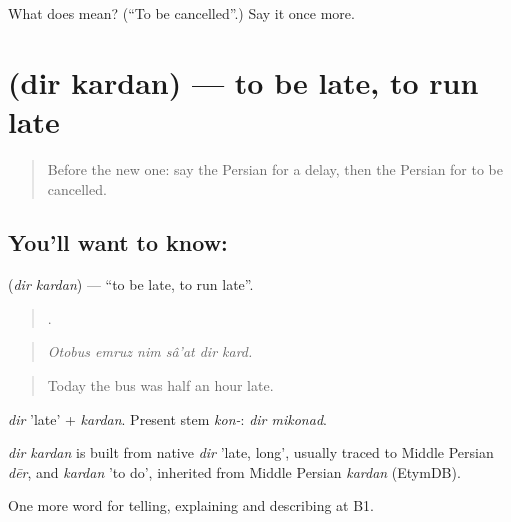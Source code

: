 \begin{tcolorbox}[breakable,colback=teal!4,colframe=teal!35!black,title={Before you move on}]
What does   mean? (\textquotedblleft{}To be cancelled\textquotedblright{}.) Say it once more.
\end{tcolorbox}
\section[\texorpdfstring{\fa{دیر} \fa{کردن} (dir kardan)}{دیر کردن (dir kardan)}]{  (dir kardan) — to be late, to run late}

\label{lesson:FA-C430-dir-kardan}



\begin{quote}
Before the new one: say the Persian for a delay, then the Persian for to be cancelled.
\end{quote}

\subsection*{You'll want to know:  }
\textbf{ } (\emph{dir kardan}) — \textquotedblleft{}to be late, to run late\textquotedblright{}.

\begin{quote}
     .
\end{quote}

\begin{quote}
\emph{Otobus emruz nim sâ'at dir kard.}
\end{quote}

\begin{quote}
Today the bus was half an hour late.
\end{quote}

\emph{dir} 'late' + \emph{kardan}. Present stem \emph{kon-}: \emph{dir mikonad}.

\begin{cousinweb}
\emph{dir kardan} is built from native \emph{dir} 'late, long', usually traced to Middle Persian \emph{dēr}, and \emph{kardan} 'to do', inherited from Middle Persian \emph{kardan} (EtymDB).
\end{cousinweb}

\begin{grammarlens}[title={What you've built}]
One more word for telling, explaining and describing at B1.
\end{grammarlens}

